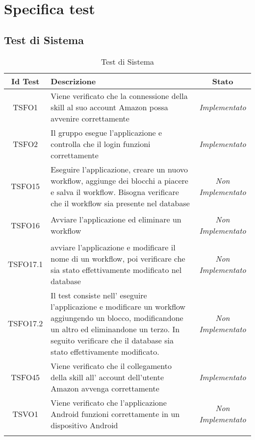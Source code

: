 \chapter{Specifica test}
\label{test}
\section{Test di Sistema}
\normalsize
\begin{longtable}{|c|>{}m{8cm}|c|}
\hline 
\textbf{Id Test} & \textbf{Descrizione} & \textbf{Stato}\\
\hline
\endhead
\hypertarget{TSFO1}{TSFO1} & Viene verificato che la connessione della skill al suo account Amazon possa avvenire correttamente & \textit{Implementato}\\ \hline
\hypertarget{TSFO2}{TSFO2} & Il gruppo esegue l'applicazione e controlla che il login funzioni correttamente & \textit{Implementato}\\ \hline
\hypertarget{TSFO15}{TSFO15} & Eseguire l'applicazione, creare un nuovo workflow, aggiunge dei blocchi a piacere e salva il workflow. Bisogna verificare che il workflow sia presente nel database & \textit{Non Implementato}\\ \hline
\hypertarget{TSFO16}{TSFO16} & Avviare l'applicazione ed eliminare un workflow & \textit{Non Implementato}\\ \hline
\hypertarget{TSFO17.1}{TSFO17.1} & avviare l'applicazione e modificare il nome di un workflow, poi verificare che sia stato effettivamente modificato nel database & \textit{Non Implementato}\\ \hline
\hypertarget{TSFO17.2}{TSFO17.2} & Il test consiste nell' eseguire l'applicazione e modificare un workflow aggiungendo un blocco, modificandone un altro ed eliminandone un terzo. In seguito verificare che il database sia stato effettivamente modificato. & \textit{Non Implementato}\\ \hline
\hypertarget{TSFO45}{TSFO45} & Viene verificato che il collegamento della skill all' account dell'utente Amazon avvenga correttamente & \textit{Implementato}\\ \hline
\hypertarget{TSVO1}{TSVO1} & Viene verificato che l'applicazione Android funzioni correttamente in un dispositivo Android & \textit{Non Implementato}\\ \hline
\caption[Test di Sistema]{Test di Sistema}
\label{tabella:test1}
\end{longtable}
\clearpage

